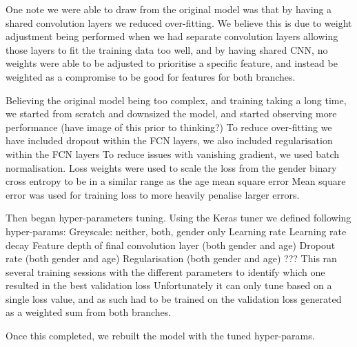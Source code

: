 One note we were able to draw from the original model was that by having a shared convolution layers we reduced over-fitting.
We believe this is due to weight adjustment being performed when we had separate convolution layers allowing those layers to fit the training data too well, and by having shared CNN, no weights were able to be adjusted to prioritise a specific feature, and instead be weighted as a compromise to be good for features for both branches.

Believing the original model being too complex, and training taking a long time, we started from scratch and downsized the model, and started observing more performance (have image of this prior to thinking?)
To reduce over-fitting we have included dropout within the FCN layers, we also included regularisation within the FCN layers
To reduce issues with vanishing gradient, we used batch normalisation.
Loss weights were used to scale the loss from the gender binary cross entropy to be in a similar range as the age mean square error
Mean square error was used for training loss to more heavily penalise larger errors.

Then began hyper-parameters tuning.
Using the Keras tuner we defined following hyper-params:
Greyscale: neither, both, gender only
Learning rate
Learning rate decay
Feature depth of final convolution layer (both gender and age)
Dropout rate (both gender and age)
Regularisation (both gender and age)
???
This ran several training sessions with the different parameters to identify which one resulted in the best validation loss
Unfortunately it can only tune based on a single loss value, and as such had to be trained on the validation loss generated as a weighted sum from both branches.

Once this completed, we rebuilt the model with the tuned hyper-params.